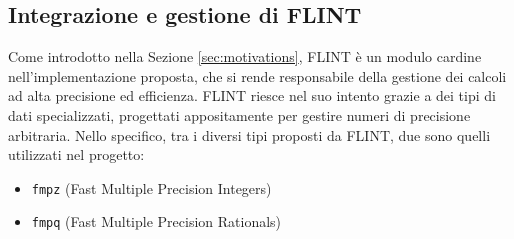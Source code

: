 \subsection{Integrazione e gestione di FLINT}
\label{sec:FLINT}

Come introdotto nella Sezione \ref{sec:motivations}, FLINT è un modulo cardine nell'implementazione 
proposta, che si rende responsabile della gestione dei calcoli ad alta precisione ed efficienza. 
FLINT riesce nel suo intento grazie a dei tipi di dati specializzati, 
progettati appositamente per gestire numeri di precisione arbitraria. Nello specifico, 
tra i diversi tipi proposti da FLINT, due sono quelli utilizzati nel progetto:
\begin{itemize}
    \item \texttt{fmpz} (Fast Multiple Precision Integers)
    \item \texttt{fmpq} (Fast Multiple Precision Rationals)
\end{itemize}

